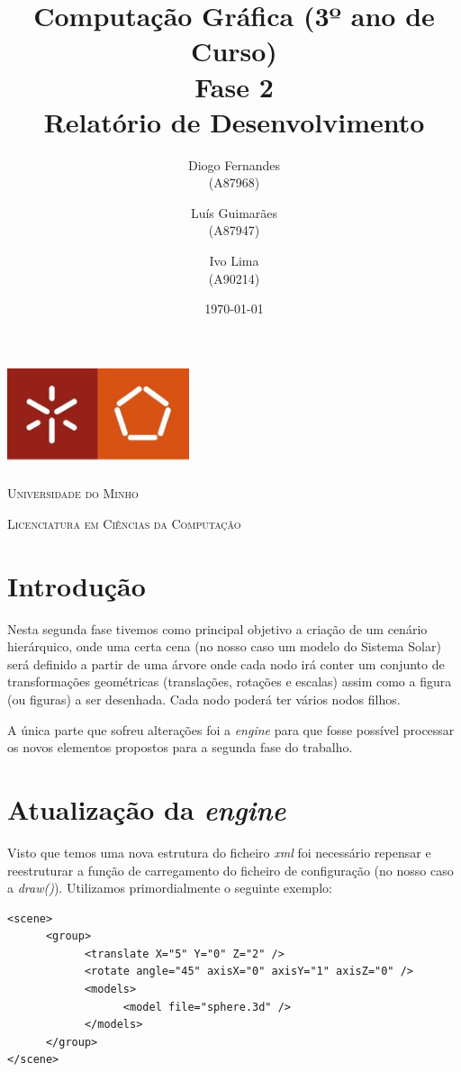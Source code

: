 \documentclass[11pt,a4paper]{report}
\title{Computação Gráfica (3º ano de Curso)\\
       \textbf{Fase 2}\\ Relatório de Desenvolvimento
       } %
\author{Diogo Fernandes\\ (A87968) \and Luís Guimarães\\ (A87947)
         \and Ivo Lima\\ (A90214)
       } %
\date{\today} %
\begin{document}
	\begin{minipage}{0.9\linewidth}
        \centering
		\includegraphics[width=0.4\textwidth]{um.jpeg}\par\vspace{1cm}
		{\scshape\LARGE Universidade do Minho} \par
		\vspace{0.6cm}
		{\scshape\Large Licenciatura em Ciências da Computação} \par
		\maketitle
	\end{minipage}

\tableofcontents %

\chapter{Introdução}

Nesta segunda fase tivemos como principal objetivo a criação de um cenário hierárquico, onde uma certa cena (no nosso caso um modelo do Sistema Solar) será definido a partir de uma árvore onde cada nodo irá conter um conjunto de transformações geométricas (translações, rotações e escalas) assim como a figura (ou figuras) a ser desenhada. Cada nodo poderá ter vários nodos filhos.

A única parte que sofreu alterações foi a \emph{engine} para que fosse possível processar os novos elementos propostos para a segunda fase do trabalho.

\chapter{Atualização da \emph{engine}}
Visto que temos uma nova estrutura do ficheiro \emph{xml} foi necessário repensar e reestruturar a função de carregamento do ficheiro de configuração (no nosso caso a \emph{draw()}). Utilizamos primordialmente o seguinte exemplo:

\begin{lstlisting}[style = xml]
<scene>
      <group>
            <translate X="5" Y="0" Z="2" />
            <rotate angle="45" axisX="0" axisY="1" axisZ="0" />
            <models>
                  <model file="sphere.3d" />
            </models>
      </group>
</scene>
\end{lstlisting}
\end{document}
